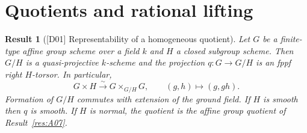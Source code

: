 \documentclass[11pt,a4paper,openany,oneside]{book}
\theoremstyle{resultstyle}
\newtheorem{statement}{Result}[chapter]
\newenvironment{result}[2]{\clubpenalty=10000\begin{statement}[\textnormal{[#1]} #2]\leavevmode\label{res:#1}\ignorespaces}{\end{statement}}
\theoremstyle{definition}
\numberwithin{equation}{chapter}
\begin{document}
\section{Quotients and rational lifting}

\begin{result}{D01}{Representability of a homogeneous quotient}
Let \(G\) be a finite-type affine group scheme over a field \(k\) and \(H\) a closed subgroup scheme. Then \(G/H\) is a quasi-projective \(k\)-scheme and the projection \(q:G\to G/H\) is an fppf right \(H\)-torsor. In particular,
\[
  G\times H \xrightarrow{\ \sim\ } G\times_{G/H}G,
  \qquad (g,h)\longmapsto(g,gh).
\]
Formation of \(G/H\) commutes with extension of the ground field. If \(H\) is smooth then \(q\) is smooth. If \(H\) is normal, the quotient is the affine group quotient of Result~\ref{res:A07}.
\end{result}
\end{document}
